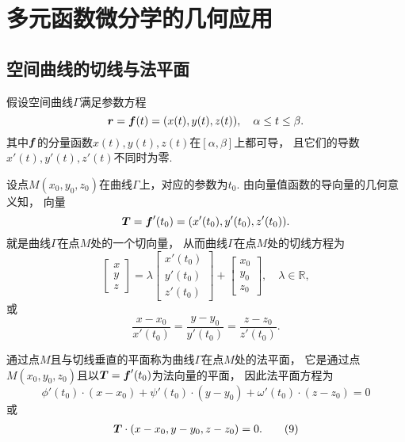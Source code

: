\section{多元函数微分学的几何应用}
\subsection{空间曲线的切线与法平面}
假设空间曲线\(\Gamma\)满足参数方程 
\[
	\boldsymbol{r}
	= \boldsymbol{f}(t)
	= (x(t),y(t),z(t)),
	\quad \alpha \leq t \leq \beta.
\]
其中\(\boldsymbol{f}\)的分量函数\(x(t),y(t),z(t)\)在\([\alpha,\beta]\)上都可导，
且它们的导数\(x'(t),y'(t),z'(t)\)不同时为零.

设点\(M(x_0,y_0,z_0)\)在曲线\(\Gamma\)上，对应的参数为\(t_0\).
由向量值函数的导向量的几何意义知，
向量\begin{equation}
	\boldsymbol{T}
	= \boldsymbol{f}'(t_0)
	= (x'(t_0),y'(t_0),z'(t_0)).
\end{equation}
就是曲线\(\Gamma\)在点\(M\)处的一个切向量，
从而曲线\(\Gamma\)在点\(M\)处的切线方程为
\begin{equation}
	\begin{bmatrix}
		x \\
		y \\
		z
	\end{bmatrix}
	= \lambda \begin{bmatrix}
		x'(t_0) \\
		y'(t_0) \\
		z'(t_0)
	\end{bmatrix}
	+ \begin{bmatrix}
		x_0 \\
		y_0 \\
		z_0
	\end{bmatrix},
	\quad \lambda\in\mathbb{R},
\end{equation}
或
\begin{equation}\label{equation:多元函数微分学的几何应用.曲线的切线方程}
	\frac{x-x_0}{x'(t_0)}
	=\frac{y-y_0}{y'(t_0)}
	=\frac{z-z_0}{z'(t_0)}.
\end{equation}

通过点\(M\)且与切线垂直的平面称为曲线\(\Gamma\)在点\(M\)处的法平面，
它是通过点\(M(x_0,y_0,z_0)\)且以\(\boldsymbol{T}=\boldsymbol{f}'(t_0)\)为法向量的平面，
因此法平面方程为\[
	\phi'(t_0) \cdot (x-x_0) + \psi'(t_0) \cdot (y-y_0) + \omega'(t_0) \cdot (z-z_0) = 0
\]
或\begin{gather}
	\vb{T}\cdot(x-x_0,y-y_0,z-z_0)=0.
	\tag9
\end{gather}

